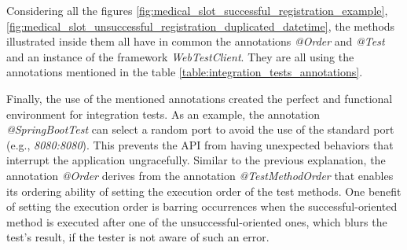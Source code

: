 Considering all the figures \ref{fig:medical_slot_successful_registration_example}, \ref{fig:medical_slot_unsuccessful_registration_duplicated_datetime}, the methods illustrated inside them all have in common the annotations \textit{@Order} and \textit{@Test} and an instance of the framework \textit{WebTestClient}. They are all using the annotations mentioned in the table \ref{table:integration_tests_annotations}. 

Finally, the use of the mentioned annotations created the perfect and functional environment for integration tests. As an example, the annotation \textit{@SpringBootTest} can select a random port to avoid the use of the standard port (e.g., \textit{8080:8080}). This prevents the API from having unexpected behaviors that interrupt the application ungracefully. Similar to the previous explanation, the annotation \textit{@Order} derives from the annotation \textit{@TestMethodOrder} that enables its ordering ability of setting the execution order of the test methods. One benefit of setting the execution order is barring occurrences when the successful-oriented method is executed after one of the unsuccessful-oriented ones, which blurs the test's result, if the tester is not aware of such an error.
